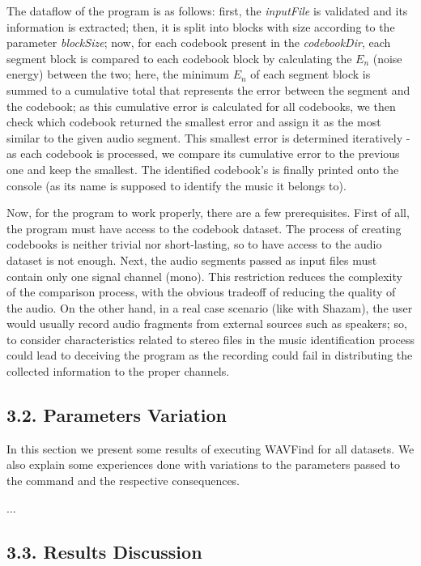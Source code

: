 \documentclass[12pt]{article}
\begin{document}
The dataflow of the program is as follows:
first, the {\it inputFile\/} is validated and its information is extracted; 
then, it is split into blocks with size according to the parameter {\it blockSize\/}; 
now, for each codebook present in the {\it codebookDir\/}, each segment block 
is compared to each codebook block by calculating the $E_n$ (noise energy) 
between the two;
here, the minimum $E_n$ of each segment block is summed to a cumulative total
that represents the error between the segment and the codebook;
as this cumulative error is calculated for all codebooks, we then check which 
codebook returned the smallest error and assign it as the most similar to the
given audio segment.
This smallest error is determined iteratively - as each codebook is processed, 
we compare its cumulative error to the previous one and keep the smallest.
The identified codebook's is finally printed onto the console (as its name is 
supposed to identify the music it belongs to).

Now, for the program to work properly, there are a few prerequisites.
First of all, the program must have access to the codebook dataset.
The process of creating codebooks is neither trivial nor short-lasting, so to 
have access to the audio dataset is not enough.
Next, the audio segments passed as input files must contain only one signal 
channel (mono).
This restriction reduces the complexity of the comparison process, with the
obvious tradeoff of reducing the quality of the audio.
On the other hand, in a real case scenario (like with Shazam), the user would
usually record audio fragments from external sources such as speakers; so, to 
consider characteristics related to stereo files in the music identification 
process could lead to deceiving the program as the recording could fail in 
distributing the collected information to the proper channels.

\subsection*{3.2. Parameters Variation}

In this section we present some results of executing WAVFind for all datasets.
We also explain some experiences done with variations to the parameters passed
to the command and the respective consequences.

...

\subsection*{3.3. Results Discussion}
\end{document}
